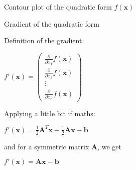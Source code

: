 \documentclass[12pt,t]{beamer}
\begin{document}
\begin{frame}{Contour plot of the quadratic form $f(\mathbf{x})$}

\begin{center}
\end{center}
\vspace{-0.5cm}
\end{frame}

\begin{frame}{Gradient of the quadratic form}

\begin{block}{Definition of the gradient:}
\vspace{0.25cm}
\begin{center}
$f'(\mathbf{x})=\begin{pmatrix}
\frac{\partial }{\partial x_1} f(\mathbf{x}) \\
\frac{\partial }{\partial x_2} f(\mathbf{x}) \\
\vdots \\
\frac{\partial }{\partial x_n} f(\mathbf{x})
\end{pmatrix}$
\end{center}
\end{block}
Applying a little bit if maths:

\begin{center}
$f'(\mathbf{x}) = \frac{1}{2} \mathbf{A}^T \mathbf{x} + \frac{1}{2} \mathbf{A} \mathbf{x}-\mathbf{b}$
\end{center}
and for a symmetric matrix $\mathbf{A}$, we get
\begin{center}
$f'(\mathbf{x})= \mathbf{A}\mathbf{x}-\mathbf{b}$
\end{center}
\end{frame}
\end{document}
